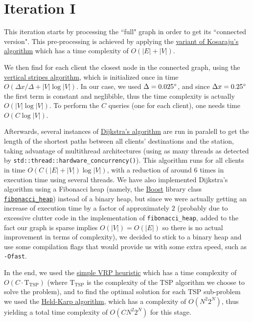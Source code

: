 \section{Iteration I} \label{iterations-1}
This iteration starts by processing the ``full" graph in order to get its ``connected version". This pre-processing is achieved by applying the \hyperref[algorithm-scc-kosaraju-v]{variant of Kosaraju's algorithm} which has a time complexity of $O(|E| + |V|)$.\par
We then find for each client the closest node in the connected graph, using the \hyperref[algorithm-vstripes]{vertical stripes algorithm}, which is initialized once in time $O(\Delta x / \Delta + |V| \log |V|)$. In our case, we used $\Delta = 0.025^{\circ}$, and since $\Delta x = 0.25^{\circ}$ the first term is constant and neglibible, thus the time complexity is actually $O(|V| \log |V|)$. To perform the $C$ queries (one for each client), one needs time $O(C \log |V|)$.\par
Afterwards, several instances of \hyperref[algorithm-shortestpath-dijkstra]{Dijkstra's algorithm} are run in paralell to get the length of the shortest paths between all clients' destinations and the station, taking advantage of multithread architectures (using as many threads as detected by \texttt{std::thread::hardware\_concurrency()}). This algorithm runs for all clients in time $O(C(|E|+|V|) \log |V|)$, with a reduction of around 6 times in execution time using several threads. We have also implemented Dijkstra's algorithm using a Fibonacci heap (namely, the \href{https://www.boost.org/}{Boost} library class \href{https://www.boost.org/doc/libs/1_49_0/doc/html/boost/heap/fibonacci_heap.html}{\texttt{fibonacci\_heap}}) instead of a binary heap, but since we were actually getting an increase of execution time by a factor of approximately $2$ (probably due to excessive clutter code in the implementation of \texttt{fibonacci\_heap}, added to the fact our graph is sparse implies $O(|V|)=O(|E|)$ so there is no actual improvement in terms of complexity), we decided to stick to a binary heap and use some compilation flags that would provide us with some extra speed, such as \texttt{-Ofast}.
\par
In the end, we used the \hyperref[algorithm-vrp-heuristic]{simple \acrshort*{VRP} heuristic} which has a time complexity of $O(C \cdot \text{T}_\text{TSP})$ (where $\text{T}_\text{TSP}$ is the complexity of the \acrshort{TSP} algorithm we choose to solve the problem), and to find the optimal solution for each \acrshort{TSP} sub-problem we used the \hyperref[algorithm-tsp-heldkarp]{Held-Karp algorithm}, which has a complexity of $O(N^2 2^N)$, thus yielding a total time complexity of $O(C N^2 2^N)$ for this stage.\par

